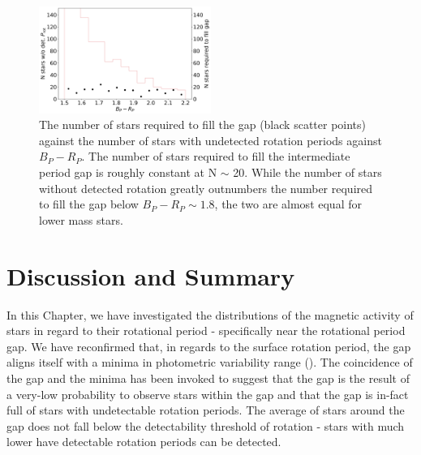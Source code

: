 \begin{figure}
\centering
    \includegraphics[width=0.5\textwidth]{Figures/rot_gap_figures/stars_donot_fullgap.png}
    \caption{
    	The number of stars required to fill the gap (black scatter points) against the number of stars with undetected rotation periods against $B_P-R_P$. The number of stars required to fill the intermediate period gap is roughly constant at N $\sim$ 20. While the number of stars without detected rotation greatly outnumbers the number required to fill the gap below $B_P-R_P \sim 1.8$, the two are almost equal for lower mass stars.
}
    \label{fig:stars_not_fill}
\end{figure}




\section{Discussion and Summary}
\label{sec:disc_sum}

In this Chapter, we have investigated the distributions of the magnetic activity of stars in regard to their rotational period - specifically near the rotational period gap.
We have reconfirmed that, in regards to the surface rotation period, the gap aligns itself with a minima in photometric variability range (\rper{}).
The coincidence of the gap and the minima has been invoked to suggest that the gap is the result of a very-low probability to observe stars within the gap and that the gap is in-fact full of stars with undetectable rotation periods.
The average \rper{} of stars around the gap does not fall below the detectability threshold of rotation - stars with much lower \rper{} have detectable rotation periods can be detected.


